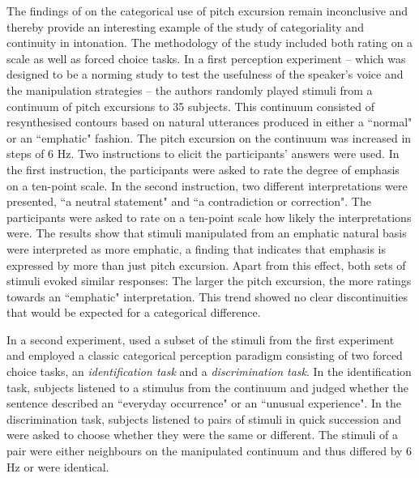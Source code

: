 The findings of \citet{LaddMorton1997} on the categorical use of pitch excursion remain inconclusive and thereby provide an interesting example of the study of categoriality and continuity in intonation. The methodology of the study included both rating on a scale as well as forced choice tasks. In a first perception experiment -- which was designed to be a norming study to test the usefulness of the speaker's voice and the manipulation strategies -- the authors randomly played stimuli from a continuum of pitch excursions to 35 subjects. This continuum consisted of resynthesised contours based on natural utterances produced in either a ``normal" or an ``emphatic" fashion. The pitch excursion on the continuum was increased in steps of 6 Hz. Two instructions to elicit the participants' answers were used. In the first instruction, the participants were asked to rate the degree of emphasis on a ten-point scale. In the second instruction, two different interpretations were presented, ``a neutral statement" and ``a contradiction or correction". The participants were asked to rate on a ten-point scale how likely the interpretations were. The results show that stimuli manipulated from an emphatic natural basis were interpreted as more emphatic, a finding that indicates that emphasis is expressed by more than just pitch excursion. Apart from this effect, both sets of stimuli evoked similar responses: The larger the pitch excursion, the more ratings towards an ``emphatic" interpretation. This trend showed no clear discontinuities that would be expected for a categorical difference.

In a second experiment, \citet{LaddMorton1997} used a subset of the stimuli from the first experiment and employed a classic categorical perception paradigm consisting of two forced choice tasks, an \emph{identification task} and a \emph{discrimination task}. In the identification task, subjects listened to a stimulus from the continuum and judged whether the sentence described an ``everyday occurrence" or an ``unusual experience". In the discrimination task, subjects listened to pairs of stimuli in quick succession and were asked to choose whether they were the same or different. The stimuli of a pair were either neighbours on the manipulated continuum and thus differed by 6 Hz or were identical. 


